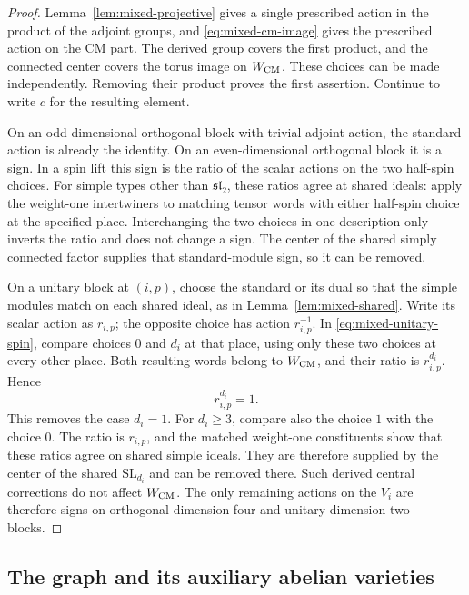 \documentclass[11pt]{article}
\numberwithin{equation}{section}
\theoremstyle{definition}
\theoremstyle{remark}
\begin{document}
\begin{proof}
Lemma~\ref{lem:mixed-projective} gives a single prescribed action
in the product of the adjoint groups, and
\eqref{eq:mixed-cm-image} gives the prescribed action on the CM
part.  The derived group covers the first product, and the connected
center covers the torus image on $W_{\rm CM}$.  These choices can
be made independently.  Removing their product proves the first
assertion.  Continue to write $c$ for the resulting element.

On an odd-dimensional orthogonal block with trivial adjoint action,
the standard action is already the identity.  On an even-dimensional
orthogonal block it is a sign.  In a spin lift this sign is the ratio
of the scalar actions on the two half-spin choices.  For simple
types other than $\mathfrak{sl}_2$, these ratios agree at shared
ideals: apply the weight-one intertwiners to matching tensor words
with either half-spin choice at the specified place.  Interchanging
the two choices in one description only inverts the ratio and does
not change a sign.  The center of the shared simply connected
factor supplies that standard-module sign, so it can be removed.

On a unitary block at $(i,p)$, choose the standard or its dual so
that the simple modules match on each shared ideal, as in
Lemma~\ref{lem:mixed-shared}.  Write its scalar action as $r_{i,p}$;
the opposite choice has action $r_{i,p}^{-1}$.  In
\eqref{eq:mixed-unitary-spin}, compare choices $0$ and $d_i$ at
that place, using only these two choices at every other place.
Both resulting words belong to $W_{\rm CM}$, and their ratio is
$r_{i,p}^{d_i}$.  Hence
\begin{equation}\label{eq:mixed-unitary-root}
 r_{i,p}^{d_i}=1.
\end{equation}
This removes the case $d_i=1$.  For $d_i\ge3$, compare also the
choice $1$ with the choice $0$.  The ratio is $r_{i,p}$, and the
matched weight-one constituents show that these ratios agree on
shared simple ideals.  They are therefore supplied by the center
of the shared $\mathrm{SL}_{d_i}$ and can be removed there.
Such derived central corrections do not affect $W_{\rm CM}$.
The only remaining actions on the $V_i$ are therefore signs on
orthogonal dimension-four and unitary dimension-two blocks.
\end{proof}

\subsection{The graph and its auxiliary abelian varieties}
\end{document}
